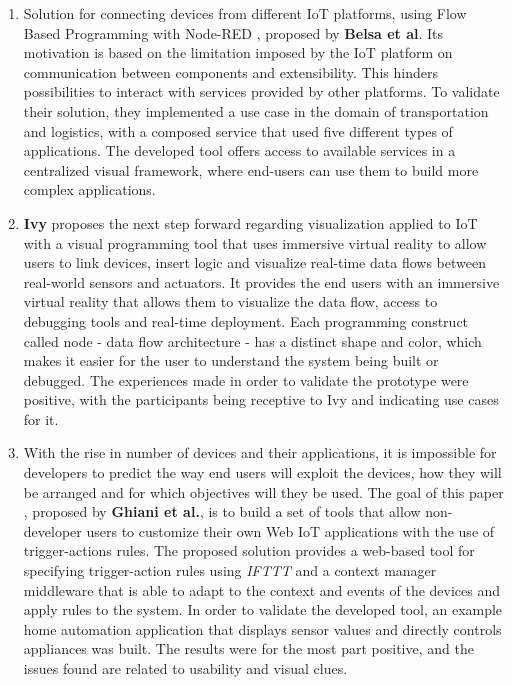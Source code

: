 \begin{enumerate}
    \item Solution for connecting devices from different IoT platforms, using Flow Based Programming with Node-RED \cite{Belsa2018}, proposed by \textbf{Belsa et al}. Its motivation is based on the limitation imposed by the IoT platform on communication between components and extensibility. This hinders possibilities to interact with services provided by other platforms. To validate their solution, they implemented a use case in the domain of transportation and logistics, with a composed service that used five different types of applications. The developed tool offers access to available services in a centralized visual framework, where end-users can use them to build more complex applications.
    \item \textbf{Ivy} \cite{ivy} proposes the next step forward regarding visualization applied to IoT with a visual programming tool that uses immersive virtual reality to allow users to link devices, insert logic and visualize real-time data flows between real-world sensors and actuators. It provides the end users with an immersive virtual reality that allows them to visualize the data flow, access to debugging tools and real-time deployment. Each programming construct called node - data flow architecture - has a distinct shape and color, which makes it easier for the user to understand the system being built or debugged. The experiences made in order to validate the prototype were positive, with the participants being receptive to Ivy and indicating use cases for it.
    \item With the rise in number of devices and their applications, it is impossible for developers to predict the way end users will exploit the devices, how they will be arranged and for which objectives will they be used. The goal of this paper \cite{personalization_of_context_dependent_apps}, proposed by \textbf{Ghiani et al.}, is to build a set of tools that allow non-developer users to customize their own Web IoT applications with the use of trigger-actions rules. The proposed solution provides a web-based tool for specifying trigger-action rules using \textit{IFTTT} and a context manager middleware that is able to adapt to the context and events of the devices and apply rules to the system. In order to validate the developed tool, an example home automation application that displays sensor values and directly controls appliances was built. The results were for the most part positive, and the issues found are related to usability and visual clues.

\end{enumerate}
